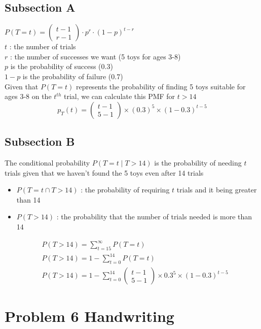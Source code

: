 \documentclass[a4paper,11pt]{article}
\theoremstyle{mytheor}
\begin{document}
\subsection{Subsection A}

$P(T=t)=\left(\begin{array}{l}t-1 \\ r-1\end{array}\right) \cdot p^r \cdot(1-p)^{t-r}$\\
$t$ : the number of trials\\
$r$ : the number of successes we want (5 toys for ages 3-8)\\
$p$ is the probability of success (0.3)\\
$1-p$ is the probability of failure (0.7)\\
Given that $P(T=t)$ represents the probability of finding 5 toys suitable for ages 3-8 on the $t^{th}$ trial, we can calculate this PMF for $t>14$
$$
p_T(t)=\left(\begin{array}{c}
t-1 \\
5-1
\end{array}\right) \times(0.3)^5 \times(1-0.3)^{t-5}
$$
\subsection{Subsection B}
The conditional probability $P(T=t \mid T>14)$ is the probability of needing $t$ trials given that we haven't found the 5 toys even after 14 trials\\
\begin{itemize}
    \item $P(T=t \cap T>14)$ : the probability of requiring $t$ trials and it being greater than 14
    \item $P(T>14)$ : the probability that the number of trials needed is more than 14
\end{itemize}

$$
\begin{aligned}
& P(T>14)=\sum_{t=15}^{\infty} P(T=t) \\
& P(T>14)=1-\sum_{t=0}^{14} P(T=t) \\
& P(T>14)=1-\sum_{t=0}^{14}\left(\begin{array}{l}
t-1 \\
5-1
\end{array}\right) \times 0.3^5 \times(1-0.3)^{t-5}
\end{aligned}
$$
\newpage
\section{Problem 6 Handwriting}
\end{document}
